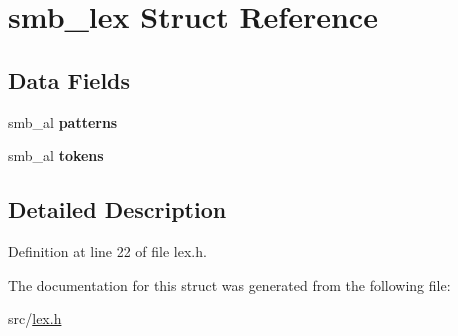 \hypertarget{structsmb__lex}{\section{smb\-\_\-lex \-Struct \-Reference}
\label{structsmb__lex}
}
\subsection*{\-Data \-Fields}
\begin{DoxyCompactItemize}
\item 
\hypertarget{structsmb__lex_afe2a4887395d4c75e7672d1bee9e71de}{smb\-\_\-al {\bfseries patterns}}\label{structsmb__lex_afe2a4887395d4c75e7672d1bee9e71de}

\item 
\hypertarget{structsmb__lex_ac29456287cb28d1f74287003ddefa1f1}{smb\-\_\-al {\bfseries tokens}}\label{structsmb__lex_ac29456287cb28d1f74287003ddefa1f1}

\end{DoxyCompactItemize}


\subsection{\-Detailed \-Description}


\-Definition at line 22 of file lex.\-h.



\-The documentation for this struct was generated from the following file\-:\begin{DoxyCompactItemize}
\item 
src/\hyperlink{lex_8h}{lex.\-h}\end{DoxyCompactItemize}
